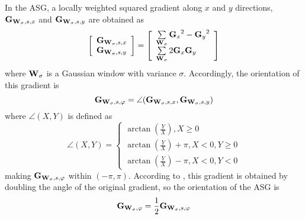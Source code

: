 In the ASG, a locally weighted squared gradient \cite{kass1987analyzing} along $x$ and $y$ directions, ${\bf{G}}_{{{\bf{W}}_\sigma},s,x}$ and ${\bf{G}}_{{\bf{W}_\sigma},s,y}$ are obtained as
\begin{equation} \label{eqPMOM3}
\left[ \begin{array}{l}
{{\bf{G}}_{{{\bf{W}}_\sigma},s,x}}\\
{{\bf{G}}_{{{\bf{W}}_\sigma},s,y}}
\end{array} \right] = \left[ \begin{array}{l}
\sum\limits_{{\bf{W}}_\sigma} {{{\bf{G}}_x}^2 - {{\bf{G}}_y}^2} \\
\sum\limits_{{\bf{W}}_\sigma} {2{{\bf{G}}_x}{{\bf{G}}_y}}
\end{array} \right]
\end{equation}
where ${\bf{W}}_\sigma$ is a Gaussian window with variance $\sigma$. Accordingly, the orientation of this gradient is
\begin{equation} \label{eqPMOM4}
{{\bf{G}}_{{{\bf{W}}_\sigma },s,\varphi }} = \angle ({{\bf{G}}_{{{\bf{W}}_\sigma },s,x}},{{\bf{G}}_{{{\bf{W}}_\sigma },s,y}})
\end{equation}
where $\angle (X,Y)$ is defined as
\begin{equation} \label{eqPMOM5}
\angle (X,Y) = \left\{ \begin{array}{l}
\arctan (\frac{Y}{X}), X \ge 0\\
\arctan (\frac{Y}{X}) + \pi , X < 0,Y \ge 0\\
\arctan (\frac{Y}{X}) - \pi , X < 0,Y < 0
\end{array} \right.
\end{equation}
making ${\bf{G}}_{{{\bf{W}}_\sigma },s,\varphi }$ within $(-\pi,\pi)$. According to \cite{kass1987analyzing}, this gradient is obtained by doubling the angle of the original gradient, so the orientation of the ASG is
\begin{equation} \label{eqPMOM6}
{{\bf{G}}_{{{\bf{W}}_\sigma},\varphi }} = \frac{1}{2}{{\bf{G}}_{{{\bf{W}}_\sigma},s,\varphi }}
\end{equation}

